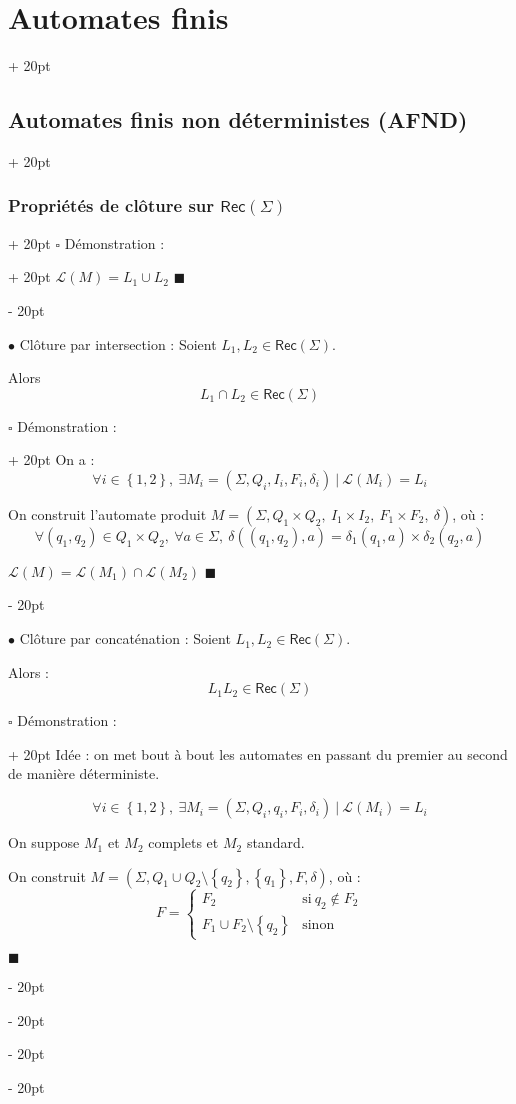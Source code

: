 \documentclass[a4paper, 12pt, twoside]{article}
\newcommand{\lr}[1]{\left( #1 \right)}
\newcommand{\set}[1]{\left\{ #1 \right\}}
\newcommand{\ind}[1][20pt]{\advance\leftskip + #1}
\newcommand{\deind}[1][20pt]{\advance\leftskip - #1}
\newenvironment{indt}[2][20pt]{#2 \par \ind[#1]}{\par \deind} %
\newenvironment{proof}[1][{Démonstration :}]{\begin{indt}{$\square$ #1}}{$\blacksquare$ \end{indt}}
\newcommand{\Rec}[1]{\mathsf{Rec}\!\lr{#1}}
\begin{document}
\begin{indt}{\section{Automates finis}}
\begin{indt}{\subsection{Automates finis non déterministes (AFND)}}
\begin{indt}{\subsubsection{Propriétés de clôture sur $\Rec \Sigma$}}
\begin{proof}
                     $\mathcal L(M) = L_1 \cup L_2$
                \end{proof}

                \vspace{12pt}
                
                $\bullet$ Clôture par intersection :
                Soient $L_1, L_2 \in \Rec \Sigma$.

                Alors
                \[
                    L_1 \cap L_2 \in \Rec \Sigma
                \]

                \begin{proof}
                    On a :
                    \[
                        \forall i \in \set{1, 2},\ \exists M_i = (\Sigma, Q_i, I_i, F_i, \delta_i)\ |\ \mathcal L(M_i) = L_i
                    \]

                    On construit l'automate produit $M = (\Sigma, Q_1 \times Q_2,\ I_1 \times I_2,\ F_1 \times F_2,\ \delta)$, où :
                    \[
                        \forall (q_1, q_2) \in Q_1 \times Q_2,\ \forall a \in \Sigma,\ \delta((q_1, q_2), a) = \delta_1(q_1, a) \times \delta_2(q_2, a)
                    \]

                     $\mathcal L(M) = \mathcal L(M_1) \cap \mathcal L(M_2)$
                \end{proof}

                \vspace{12pt}
                
                $\bullet$ Clôture par concaténation : Soient $L_1, L_2 \in \Rec \Sigma$.

                Alors :
                \[
                    L_1 L_2 \in \Rec \Sigma
                \]

                \begin{proof}
                    Idée : on met bout à bout les automates en passant du premier au second de manière déterministe.

                    \[
                        \forall i \in \set{1, 2},\ \exists M_i = (\Sigma, Q_i, q_i, F_i, \delta_i)\ |\ \mathcal L(M_i) = L_i
                    \]

                    On suppose $M_1$ et $M_2$ complets et $M_2$ standard.

                    On construit $M = \lr{\Sigma, Q_1 \cup Q_2 \setminus \set{q_2}, \set{q_1}, F, \delta}$, où :
                    \[
                        F =
                        \begin{cases}
                            F_2
                            & \text{si}\ q_2 \notin F_2
                            \\
                            F_1 \cup F_2 \setminus \set{q_2}
                            & \text{sinon}
                        \end{cases}
                    \]


\end{proof}
\end{indt}
\end{indt}
\end{indt}
\end{document}
